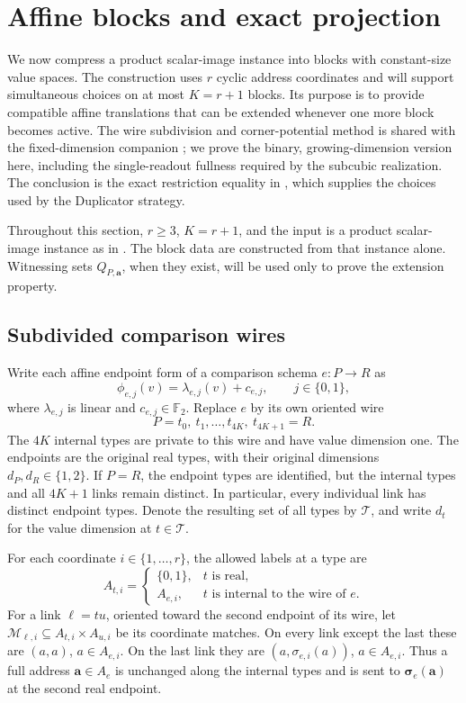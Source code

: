 \documentclass[11pt]{article}
\theoremstyle{definition}
\newcommand{\F}{\mathbb F_2}
\newcommand{\cM}{\mathcal M}
\begin{document}
\section{Affine blocks and exact projection}
\label{offset:section}

We now compress a product scalar-image instance into blocks with
constant-size value spaces. The construction uses \(r\) cyclic address
coordinates and will support simultaneous choices on at most
\(K=r+1\) blocks. Its purpose is to provide compatible affine translations
that can be extended whenever one more block becomes active. The wire subdivision and corner-potential method is shared with
the fixed-dimension companion \citep[Section~3]{CompanionFixedDimension};
we prove the binary, growing-dimension version here, including the
single-readout fullness required by the subcubic realization. The conclusion is the exact restriction equality in
, which supplies the choices used by the
Duplicator strategy.

Throughout this section, \(r\geq 3\), \(K=r+1\), and the input is a product
scalar-image instance as in . The block data are
constructed from that instance alone. Witnessing sets \(Q_{P,\mathbf a}\),
when they exist, will be used only to prove the extension property.

\subsection{Subdivided comparison wires}
\label{offset:subdivision}

Write each affine endpoint form of a comparison schema \(e:P\to R\) as
\[
  \phi_{e,j}(v)=\lambda_{e,j}(v)+c_{e,j},
  \qquad j\in\{0,1\},
\]
where \(\lambda_{e,j}\) is linear and \(c_{e,j}\in\F\).
Replace \(e\) by its own oriented wire
\[
  P=t_0,\ t_1,\ldots,t_{4K},\ t_{4K+1}=R.
\]
The \(4K\) internal types are private to this wire and have value dimension
one. The endpoints are the original real types, with their original
dimensions \(d_P,d_R\in\{1,2\}\). If \(P=R\), the endpoint types are
identified, but the internal types and all \(4K+1\) links remain distinct.
In particular, every individual link has distinct endpoint types. Denote
the resulting set of all types by \(\mathcal T\), and write \(d_t\) for
the value dimension at \(t\in\mathcal T\).

For each coordinate \(i\in\{1,\ldots,r\}\), the allowed labels at a type
are
\[
 A_{t,i}=
 \begin{cases}
   \{0,1\}, & t\text{ is real},\\
   A_{e,i}, & t\text{ is internal to the wire of }e.
 \end{cases}
\]
For a link \(\ell=tu\), oriented toward the second endpoint of its wire,
let \(\cM_{\ell,i}\subseteq A_{t,i}\times A_{u,i}\) be its coordinate
matches. On every link except the last these are
\((a,a)\), \(a\in A_{e,i}\). On the last link they are
\((a,\sigma_{e,i}(a))\), \(a\in A_{e,i}\).
Thus a full address \(\mathbf a\in A_e\) is unchanged along the internal
types and is sent to \(\boldsymbol\sigma_e(\mathbf a)\) at the second real
endpoint.
\end{document}
